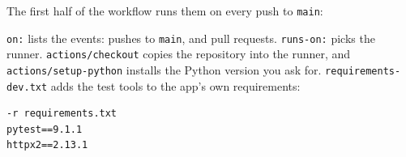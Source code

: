 
The first half of the workflow runs them on every push to \texttt{main}:

\begin{codeblock}

\begin{Shaded}
\begin{Highlighting}[]
\KeywordTok{:}

\KeywordTok{:}
\AttributeTok{  }\KeywordTok{:}
\AttributeTok{    }\KeywordTok{:}\AttributeTok{ }\KeywordTok{[}\KeywordTok{]}
\AttributeTok{  }\KeywordTok{:}

\KeywordTok{:}
\AttributeTok{  }\KeywordTok{:}

\KeywordTok{:}
\AttributeTok{  }\KeywordTok{:}
\AttributeTok{    }\KeywordTok{:}
\AttributeTok{    }\KeywordTok{:}
\AttributeTok{      }\KeywordTok{{-}}\AttributeTok{ }\KeywordTok{:}
\AttributeTok{      }\KeywordTok{{-}}\AttributeTok{ }\KeywordTok{:}
\AttributeTok{        }\KeywordTok{:}
\AttributeTok{          }\KeywordTok{:}\AttributeTok{ }
\AttributeTok{      }\KeywordTok{{-}}\AttributeTok{ }\KeywordTok{:}
\AttributeTok{      }\KeywordTok{{-}}\AttributeTok{ }\KeywordTok{:}
\end{Highlighting}
\end{Shaded}

\end{codeblock}

\texttt{on:} lists the events: pushes to \texttt{main}, and pull requests. \texttt{runs-on:} picks the runner. \texttt{actions/checkout} copies the repository into the runner, and \texttt{actions/}\allowbreak{}\texttt{setup-python} installs the Python version you ask for. \texttt{requirements-dev.txt} adds the test tools to the app's own requirements:

\begin{codeblock}
\begin{Verbatim}[formatcom=\outputstyle]
-r requirements.txt
pytest==9.1.1
httpx2==2.13.1
\end{Verbatim}
\end{codeblock}

